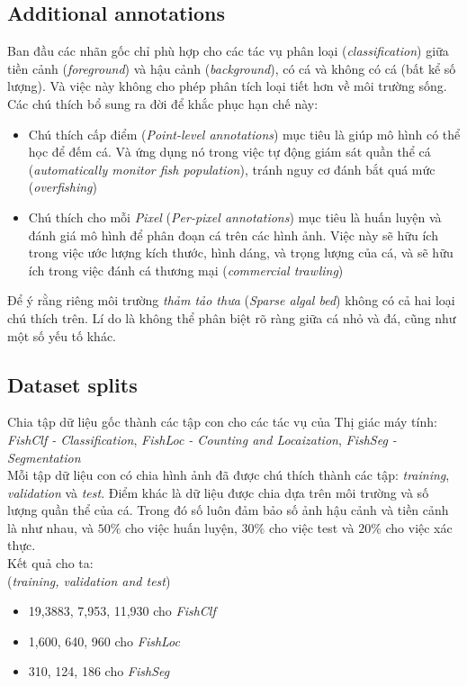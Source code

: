 \documentclass{article}
\begin{document}
        \subsection{Additional annotations}
        Ban đầu các nhãn gốc chỉ phù hợp cho các tác vụ phân loại (\textit{classification}) giữa tiền cảnh (\textit{foreground}) và hậu cảnh (\textit{background}), có cá và không có cá (bất kể số lượng). Và việc này không cho phép phân tích loại tiết hơn về môi trường sống. Các chú thích bổ sung ra đời để khắc phục hạn chế này:
        \begin{itemize}
            \item Chú thích cấp điểm (\textit{Point-level annotations}) mục tiêu là giúp mô hình có thể học để đếm cá. Và ứng dụng nó trong việc tự động giám sát quần thể cá (\textit{automatically monitor fish population}), tránh nguy cơ đánh bắt quá mức (\textit{overfishing})
            \item Chú thích cho mỗi \textit{Pixel} (\textit{Per-pixel annotations}) mục tiêu là huấn luyện và đánh giá mô hình để phân đoạn cá trên các hình ảnh. Việc này sẽ hữu ích trong việc ước lượng kích thước, hình dáng, và trọng lượng của cá, và sẽ hữu ích trong việc đánh cá thương mại (\textit{commercial trawling})
        \end{itemize}
        Để ý rằng riêng môi trường \textit{thảm tảo thưa} (\textit{Sparse algal bed}) không có cả hai loại chú thích trên. Lí do là không thể phân biệt rõ ràng giữa cá nhỏ và đá, cũng như một số yếu tố khác.

        \subsection{Dataset splits}
        Chia tập dữ liệu gốc thành các tập con cho các tác vụ của Thị giác máy tính: \textit{FishClf - Classification}, \textit{FishLoc - Counting and Locaization}, \textit{FishSeg - Segmentation}\\
        Mỗi tập dữ liệu con có chia hình ảnh đã được chú thích thành các tập: \textit{training}, \textit{validation} và \textit{test}. Điểm khác là dữ liệu được chia dựa trên môi trường và số lượng quần thể của cá. Trong đó số luôn đảm bảo số ảnh hậu cảnh và tiền cảnh là như nhau, và $50\%$ cho việc huấn luyện, $30\%$ cho việc test và $20\%$ cho việc xác thực.\\
        Kết quả cho ta:
        \\(\textit{training, validation and test})
        \begin{itemize}
            \item 19,3883, 7,953, 11,930 cho \textit{FishClf}
            \item 1,600, 640, 960 cho \textit{FishLoc}
            \item 310, 124, 186 cho \textit{FishSeg}
        \end{itemize}
\end{document}
